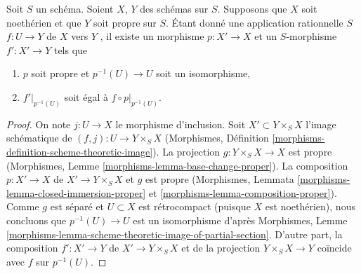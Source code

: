 \begin{lemma}
\label{lemma-extend-rational-map-after-modification}
Soit  $S$  un schéma. Soient  $X$,  $Y$  des schémas sur
 $S$. Supposons que  $X$  soit noethérien et que  $Y$  soit
propre sur  $S$. Étant donné une application rationnelle  $S$
 $f : U \to Y$  de  $X$  vers  $Y$ , il existe un morphisme
 $p : X' \to X$  et un  $S$-morphisme  $f' : X' \to Y$  tels que
\begin{enumerate}
\item $p$  soit propre et  $p^{-1}(U) \to U$  soit un isomorphisme,
\item $f'|_{p^{-1}(U)}$  soit égal à  $f \circ p|_{p^{-1}(U)}$.
\end{enumerate}
\end{lemma}

\begin{proof}
On note  $j : U \to X$  le morphisme d'inclusion. Soit  $X' \subset Y \times_S X$  l'image
schématique de  $(f, j) : U \to Y \times_S X$  (Morphismes, Définition  \ref{morphisms-definition-scheme-theoretic-image}). La projection
 $g : Y \times_S X \to X$  est propre (Morphismes, Lemme  \ref{morphisms-lemma-base-change-proper}). La composition
 $p : X' \to X$  de  $X' \to Y \times_S X$  et  $g$  est propre (Morphismes, Lemmata
 \ref{morphisms-lemma-closed-immersion-proper}  et  \ref{morphisms-lemma-composition-proper}). Comme  $g$  est séparé et  $U \subset X$  est
rétrocompact (puisque  $X$  est noethérien), nous concluons que
 $p^{-1}(U) \to U$  est un isomorphisme d'après Morphismes, Lemme  \ref{morphisms-lemma-scheme-theoretic-image-of-partial-section}. D'autre
part, la composition  $f' : X' \to Y$  de  $X' \to Y \times_S X$  et de la projection  $Y \times_S X \to Y$ 
coïncide avec  $f$  sur  $p^{-1}(U)$.
\end{proof}













